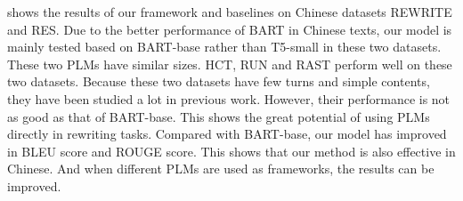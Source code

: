 shows 
the results of our framework and baselines on Chinese datasets REWRITE and RES. Due to the better performance of BART in Chinese texts, our model is mainly tested based on BART-base rather than T5-small in these two datasets. These two PLMs have similar sizes. HCT, RUN and RAST perform well on these two datasets. Because these two datasets have few turns and simple contents, they have been studied a lot in previous work. However, their performance is not as good as that of BART-base. This shows the great potential of using PLMs directly in rewriting tasks. Compared with BART-base, our model has improved in BLEU score and ROUGE score. This shows that our method is also effective in Chinese. And when different PLMs are used as frameworks, the results can be improved.

